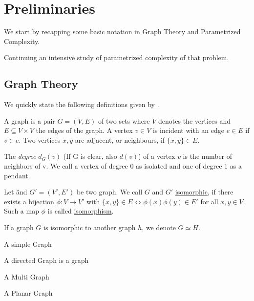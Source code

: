 \chapter{Preliminaries}
We start by recapping some basic notation in Graph Theory and Parametrized Complexity. 

Continuing an intensive study of parametrized complexity of that problem. 

\section{Graph Theory}
We quickly state the following definitions given by {\cite[p.~xxx]{diestel10}}.

\begin{definition}
    A graph is a pair $G = (V, E)$ of two sets where $V$ denotes the vertices and $E \subseteq V \times V$ the edges of the graph.  A vertex $v \in V$ is incident with an edge $e \in E$ if $v \in e$. Two vertices $x, y$ are adjacent, or neighbours, if $\{x,y \} \in E$.
\end{definition}

\begin{definition}
    The \textit{degree} $d_G(v)$ (If G is clear, also $d(v)$) of a vertex $v$ is the number of neighbors of v. We call a vertex of degree 0 as isolated and one of degree 1 as a pendant.
\end{definition}

\begin{definition}
Let \G and $G' = (V', E')$ be two graph. We call $G$ and $G'$ \underline{isomorphic}, if there exists a bijection $\phi: V \rightarrow V'$ with $\{x, y\} \in E \Leftrightarrow \phi(x)\phi(y) \in E'$ for all  $x,y \in V$. Such a map $\phi$ is called \underline{isomorphism}.
\end{definition}
If a graph $G$ is isomorphic to another graph $h$, we denote $G \simeq H$. 

\begin{definition}
    A simple Graph
    
    A directed Graph is a graph
    
    A Multi Graph
    
    A Planar Graph
\end{definition}

